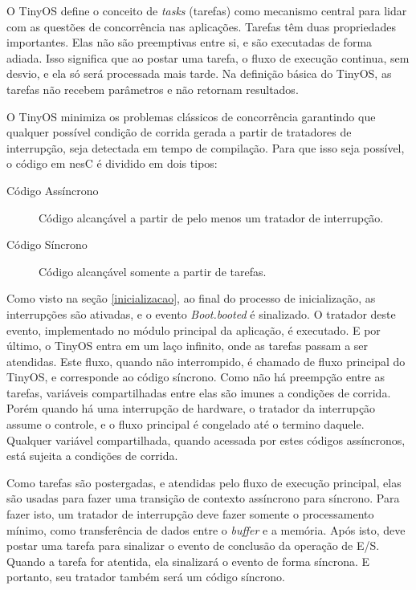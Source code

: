 O TinyOS define o conceito de {\em tasks} (tarefas) como mecanismo central para
lidar com as questões de concorrência nas aplicações. 
Tarefas têm duas propriedades importantes. Elas não são preemptivas entre si, e são
executadas de forma adiada. Isso significa que ao postar uma tarefa, o fluxo de execução continua,
sem desvio, e ela só será processada mais tarde. 
Na definição básica do TinyOS, as tarefas não recebem parâmetros e não retornam resultados. 

O TinyOS minimiza os problemas clássicos de concorrência garantindo que qualquer possível condição de
corrida gerada a partir de tratadores de interrupção, seja detectada em tempo de compilação. 
Para que isso seja possível, o código em nesC é dividido em dois tipos:
\begin{description}
    \item[Código Assíncrono] Código alcançável a partir de pelo menos um tratador de interrupção.
    \item[Código Síncrono] Código alcançável somente a partir de tarefas.
\end{description}

Como visto na seção \ref{inicializacao}, ao final do processo de inicialização, as
interrupções são ativadas, e o evento \textit{Boot.booted} é sinalizado. O tratador deste evento, implementado no 
módulo principal da aplicação, é executado. E por último, o TinyOS entra em um laço infinito, onde as tarefas passam 
a ser atendidas. Este fluxo, quando não interrompido, é chamado de fluxo principal do TinyOS, e corresponde ao código
síncrono. Como não há preempção entre as tarefas, variáveis compartilhadas entre elas são imunes a condições de corrida.
Porém quando há uma interrupção de hardware, o tratador da interrupção assume o controle, e o fluxo principal é congelado 
até o termino daquele. Qualquer variável compartilhada, quando acessada por estes códigos assíncronos, está sujeita a condições
de corrida.

Como tarefas são postergadas, e atendidas pelo fluxo de execução principal, elas são usadas para fazer uma transição de
contexto assíncrono para síncrono.
Para fazer isto, um tratador de interrupção deve fazer somente o processamento mínimo, como transferência de dados entre o
\textit{buffer} e a memória. Após isto, deve postar uma tarefa para sinalizar o evento 
de conclusão da operação de E/S. Quando a tarefa for atentida, ela sinalizará o evento de forma síncrona. E portanto,
seu tratador também será um código síncrono.

